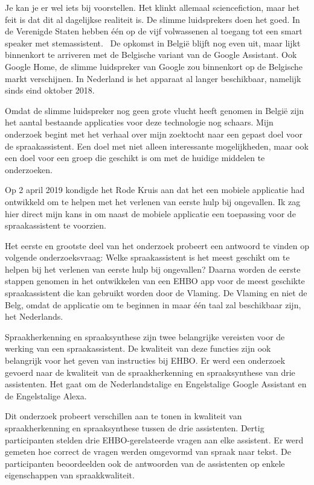 Je kan je er wel iets bij voorstellen. Het klinkt allemaal sciencefiction, maar het feit is dat dit al dagelijkse realiteit is. De slimme luidsprekers doen het goed. In de Verenigde Staten hebben één op de vijf volwassenen al toegang tot een smart speaker met stemassistent.~\autocite{Passies2018} De opkomst in België blijft nog even uit, maar lijkt binnenkort te arriveren met de Belgische variant van de Google Assistant. Ook Google Home, de slimme luidspreker van Google zou binnenkort op de Belgische markt verschijnen. In Nederland is het apparaat al langer beschikbaar, namelijk sinds eind oktober 2018.~\autocite{Haenen2018}

Omdat de slimme luidspreker nog geen grote vlucht heeft genomen in België zijn het aantal bestaande applicaties voor deze technologie nog schaars. Mijn onderzoek begint met het verhaal over mijn zoektocht naar een gepast doel voor de spraakassistent. Een doel met niet alleen interessante mogelijkheden, maar ook een doel voor een groep die geschikt is om met de huidige middelen te onderzoeken.

Op 2 april 2019 kondigde het Rode Kruis aan dat het een mobiele applicatie had ontwikkeld om te helpen met het verlenen van eerste hulp bij ongevallen. Ik zag hier direct mijn kans in om naast de mobiele applicatie een toepassing voor de spraakassistent te voorzien.

Het eerste en grootste deel van het onderzoek probeert een antwoord te vinden op volgende onderzoeksvraag: Welke spraakassistent is het meest geschikt om te helpen bij het verlenen van eerste hulp bij ongevallen? Daarna worden de eerste stappen genomen in het ontwikkelen van een EHBO app voor de meest geschikte spraakassistent die kan gebruikt worden door de Vlaming. De Vlaming en niet de Belg, omdat de applicatie om te beginnen in maar één taal zal beschikbaar zijn, het Nederlands.

Spraakherkenning en spraaksynthese zijn twee belangrijke vereisten voor de werking van een spraakassistent. De kwaliteit van deze functies zijn ook belangrijk voor het geven van instructies bij EHBO. Er werd een onderzoek gevoerd naar de kwaliteit van de spraakherkenning en spraaksynthese van drie assistenten. Het gaat om de Nederlandstalige en Engelstalige Google Assistant en de Engelstalige Alexa.

Dit onderzoek probeert verschillen aan te tonen in kwaliteit van spraakherkenning en spraaksynthese tussen de drie assistenten. Dertig participanten stelden drie EHBO-gerelateerde vragen aan elke assistent. Er werd gemeten hoe correct de vragen werden omgevormd van spraak naar tekst. De participanten beoordeelden ook de antwoorden van de assistenten op enkele eigenschappen van spraakkwaliteit.

